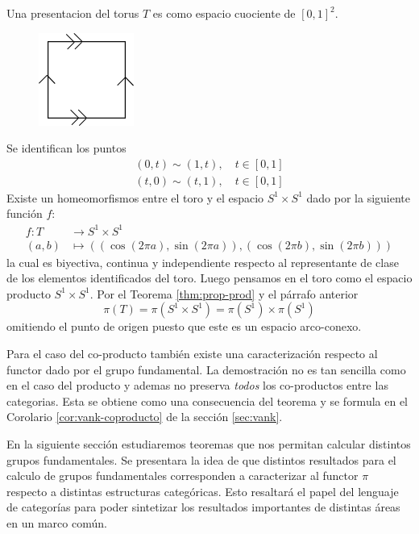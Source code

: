 \begin{ejemplo}[Toro] \label{ej:toro-presentacion}
  Una presentacion del torus \(T\) es como espacio cuociente de
  \([0,1]^2\).
  \begin{figure}[h]
    \centering \includegraphics[scale=0.5]{./imagenes/toro.png}
  \end{figure}
  Se identifican los puntos
  \begin{gather*}
    (0,t) \sim (1,t), \quad t \in [0,1] \\
    (t,0) \sim (t,1), \quad t \in [0,1]
  \end{gather*}
  Existe un homeomorfismos entre el toro y el espacio \(S^1 \times S^1\)
  dado por la siguiente función \(f\):
  \begin{align*}
    f : T &\longrightarrow S^1 \times S^1 \\
    (a,b) &\longmapsto \left( \left( \cos (2 \pi a) , \sin (2 \pi a) \right), \left( \cos (2 \pi b) , \sin (2 \pi b) \right) \right)
  \end{align*}
  la cual es biyectiva, continua y independiente respecto al
  representante de clase de los elementos identificados del toro. Luego
  pensamos en el toro como el espacio producto \(S^1 \times S^1\). Por
  el Teorema \ref{thm:prop-prod} y el párrafo anterior
  \[
    \pi \left( T \right) = \pi \left( S^1 \times S^1 \right) = \pi (S^1)
    \times \pi (S^1)
  \]
  omitiendo el punto de origen puesto que este es un espacio
  arco-conexo.
\end{ejemplo}

Para el caso del co-producto también existe una caracterización respecto
al functor dado por el grupo fundamental. La demostración no es tan
sencilla como en el caso del producto y ademas no preserva \emph{todos}
los co-productos entre las categorias. Esta se obtiene como una consecuencia
del teorema \vank y se formula en el Corolario \ref{cor:vank-coproducto} de
la sección \ref{sec:vank}.

En la siguiente sección estudiaremos teoremas que nos permitan calcular
distintos grupos fundamentales. Se presentara la idea de que distintos
resultados para el calculo de grupos fundamentales corresponden a
caracterizar al functor \(\pi\) respecto a distintas estructuras
categóricas. Esto resaltará el papel del lenguaje de categorías para
poder sintetizar los resultados importantes de distintas áreas en un
marco común.
